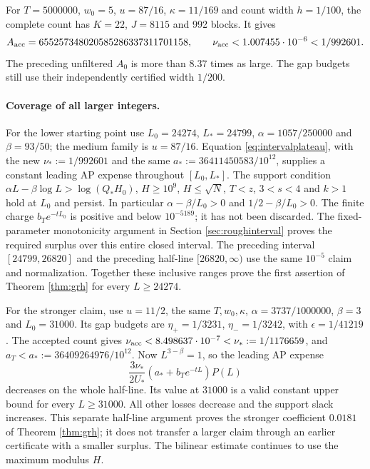 \documentclass[11pt]{article}
\begin{document}
For $T=5000000$, $w_0=5$, $u=87/16$, $\kappa=11/169$ and count width
$h=1/100$, the complete count has $K=22$, $J=8115$ and 992 blocks.
It gives
\[
A_{\rm acc}=655257348020585286337311701158,
\qquad \nu_{\rm acc}<1.007455\cdot10^{-6}<1/992601.
\]
The preceding unfiltered $A_0$ is more than $8.37$ times as large.
The gap budgets still use their independently certified width $1/200$.

\paragraph{Coverage of all larger integers.}
For the lower starting point use $L_0=24274$, $L_*=24799$,
$\alpha=1057/250000$ and $\beta=93/50$; the medium family is $u=87/16$.
Equation \eqref{eq:intervalplateau}, with the new
$\nu_*:=1/992601$ and the same $a_*:=36411450583/10^{12}$,
supplies a constant leading AP expense throughout $[L_0,L_*]$.
The support condition $\alpha L-\beta\log L>\log(Q_*H_0)$,
$H\ge10^9$, $H\le\sqrt N$, $T<z$, $3<s<4$ and $k>1$ hold at
$L_0$ and persist. In particular $\alpha-\beta/L_0>0$ and
$1/2-\beta/L_0>0$. The finite charge $b_Te^{-tL_0}$ is positive
and below $10^{-5189}$; it has not been discarded.
The fixed-parameter monotonicity argument in Section \ref{sec:roughinterval}
proves the required surplus over this entire closed interval.
The preceding interval $[24799,26820]$ and the preceding half-line
$[26820,\infty)$ use the same $10^{-5}$ claim and normalization.
Together these inclusive ranges prove the first assertion of Theorem
\ref{thm:grh} for every $L\ge24274$.

For the stronger claim, use $u=11/2$, the same $T,w_0,\kappa$,
$\alpha=3737/1000000$, $\beta=3$ and $L_0=31000$.
Its gap budgets are $\eta_+=1/3231$, $\eta_-=1/3242$, with
$\epsilon=1/41219$. The accepted count gives
$\nu_{\rm acc}<8.498637\cdot10^{-7}<\nu_*:=1/1176659$, and
$a_T<a_*:=36409264976/10^{12}$.
Now $L^{3-\beta}=1$, so the leading AP expense
\[
\frac{3\nu_*}{2U_*}(a_*+b_Te^{-tL})P(L)
\]
decreases on the whole half-line. Its value at $31000$ is a valid
constant upper bound for every $L\ge31000$.
All other losses decrease and the support slack increases.
This separate half-line argument proves the stronger coefficient
$0.0181$ of Theorem \ref{thm:grh}; it does not transfer a larger
claim through an earlier certificate with a smaller surplus.
The bilinear estimate continues to use the maximum modulus $H$.
\end{document}
